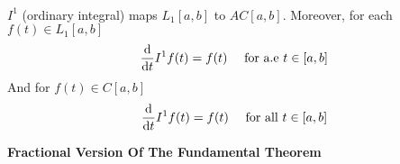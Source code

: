 \begin{theorem}
    \,\\
    $I^1$ (ordinary integral) maps $L_1[a,b]$ to $AC[a,b]$. Moreover, for each $f(t) \in L_1[a,b]$
    \[
        \dv{}{t}I^1 f(t) = f(t) \quad \text{ for a.e $t \in [a,b]$}
    \]
    And for $f(t) \in C[a,b]$
    \[
        \dv{}{t}I^1 f(t) = f(t) \quad \text{ for all $t \in [a,b]$}
    \]
\end{theorem}
\begin{property}
    \textbf{Fractional Version Of The Fundamental Theorem}
\end{property}
